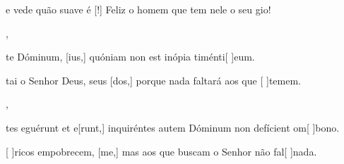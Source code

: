 {    {\item {} e vede quão suave é [!] Feliz o homem que tem nele o seu gio!~\Antiphona},
  {\item {}te Dóminum, [ius,] quóniam non est inópia timénti[ ]{e}um.~\Antiphona}%
    {\item {}tai o Senhor Deus, seus [dos,] porque nada faltará aos que [ ]{te}mem.~\Antiphona},
  {\item {}tes eguérunt et e[runt,] inquiréntes autem Dóminum non defícient om[ ]{bo}no.~\Antiphona}%
    {\item {}[ ]{ri}cos empobrecem, [me,] mas aos que buscam o Senhor não fal[ ]{na}da.~\Antiphona}
}